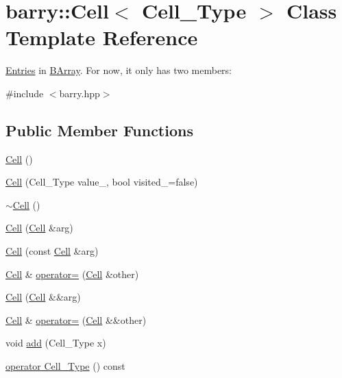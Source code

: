 \hypertarget{classbarry_1_1_cell}{}\section{barry\+:\+:Cell$<$ Cell\+\_\+\+Type $>$ Class Template Reference}
\label{classbarry_1_1_cell}


\hyperlink{classbarry_1_1_entries}{Entries} in \hyperlink{classbarry_1_1_b_array}{B\+Array}. For now, it only has two members\+:  




{\ttfamily \#include $<$barry.\+hpp$>$}

\subsection*{Public Member Functions}
\begin{DoxyCompactItemize}
\item 
\hyperlink{classbarry_1_1_cell_aa7beee933fc291cbc4ac84ec3ab63352}{Cell} ()
\item 
\hyperlink{classbarry_1_1_cell_ae315476489673759fad689eb2f8ce952}{Cell} (Cell\+\_\+\+Type value\+\_\+, bool visited\+\_\+=false)
\item 
\hyperlink{classbarry_1_1_cell_a2500924b447d4d881916749041974d81}{$\sim$\+Cell} ()
\item 
\hyperlink{classbarry_1_1_cell_a5768e9495f6d7570fdbadf362bc46e3a}{Cell} (\hyperlink{classbarry_1_1_cell}{Cell} \&arg)
\item 
\hyperlink{classbarry_1_1_cell_a5db94e6e2ad797d4e9b41e73a3a94e32}{Cell} (const \hyperlink{classbarry_1_1_cell}{Cell} \&arg)
\item 
\hyperlink{classbarry_1_1_cell}{Cell} \& \hyperlink{classbarry_1_1_cell_a2a23ba83119de9162b6e3b6a994f4b61}{operator=} (\hyperlink{classbarry_1_1_cell}{Cell} \&other)
\item 
\hyperlink{classbarry_1_1_cell_a56d2ab8f2a26b1fd8f3b3b9bfef37c1b}{Cell} (\hyperlink{classbarry_1_1_cell}{Cell} \&\&arg)
\item 
\hyperlink{classbarry_1_1_cell}{Cell} \& \hyperlink{classbarry_1_1_cell_ac0f00c52254617f8e4ba9d03ddf5b890}{operator=} (\hyperlink{classbarry_1_1_cell}{Cell} \&\&other)
\item 
void \hyperlink{classbarry_1_1_cell_a40c9aad3ba2c9d5a1a91833c66522ad8}{add} (Cell\+\_\+\+Type x)
\item 
\hyperlink{classbarry_1_1_cell_a90bea0b3306e1780747ca1ef6f389e91}{operator Cell\+\_\+\+Type} () const
\end{DoxyCompactItemize}
